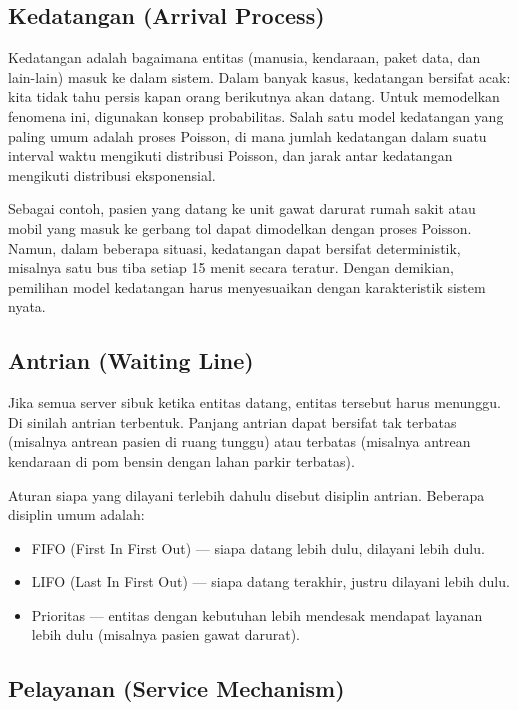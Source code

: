 \documentclass{bukumjh}
\begin{document}
\subsection{Kedatangan (Arrival Process)}

Kedatangan adalah bagaimana entitas (manusia, kendaraan, paket data, dan lain-lain) masuk ke dalam sistem. Dalam banyak kasus, kedatangan bersifat acak: kita tidak tahu persis kapan orang berikutnya akan datang. Untuk memodelkan fenomena ini, digunakan konsep probabilitas. Salah satu model kedatangan yang paling umum adalah {\jsg proses Poisson}, di mana jumlah kedatangan dalam suatu interval waktu mengikuti distribusi Poisson, dan jarak antar kedatangan mengikuti distribusi eksponensial.

Sebagai contoh, pasien yang datang ke unit gawat darurat rumah sakit atau mobil yang masuk ke gerbang tol dapat dimodelkan dengan proses Poisson. Namun, dalam beberapa situasi, kedatangan dapat bersifat deterministik, misalnya satu bus tiba setiap 15 menit secara teratur. Dengan demikian, pemilihan model kedatangan harus menyesuaikan dengan karakteristik sistem nyata.

\subsection{Antrian (Waiting Line)}

Jika semua server sibuk ketika entitas datang, entitas tersebut harus menunggu. Di sinilah antrian terbentuk. Panjang antrian dapat bersifat {\jsg tak terbatas} (misalnya antrean pasien di ruang tunggu) atau {\jsg terbatas} (misalnya antrean kendaraan di pom bensin dengan lahan parkir terbatas).

Aturan siapa yang dilayani terlebih dahulu disebut {\jsg disiplin antrian}. Beberapa disiplin umum adalah:
\begin{itemize}
    \item FIFO (First In First Out) — siapa datang lebih dulu, dilayani lebih dulu.
    \item LIFO (Last In First Out) — siapa datang terakhir, justru dilayani lebih dulu.
    \item Prioritas — entitas dengan kebutuhan lebih mendesak mendapat layanan lebih dulu (misalnya pasien gawat darurat).
\end{itemize}

\subsection{Pelayanan (Service Mechanism)}
\end{document}
